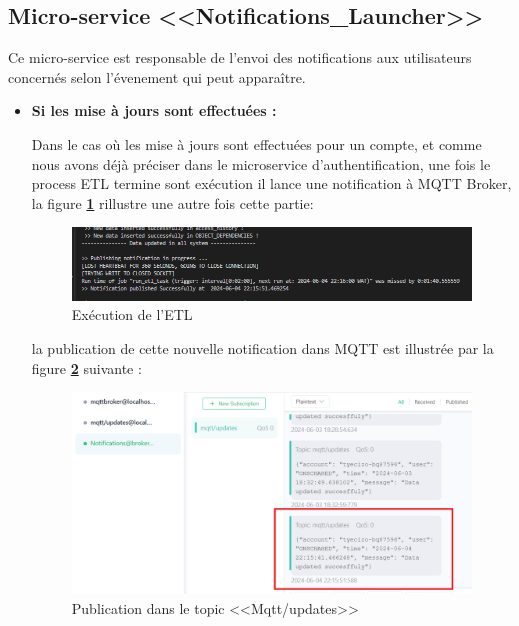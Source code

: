\subsection{Micro-service <<Notifications\_Launcher>>}
\par Ce micro-service est responsable de l'envoi des notifications aux utilisateurs concernés selon l'évenement qui peut apparaître.
\begin{itemize}
    \item \textbf{Si les mise à jours sont effectuées :}
        \par Dans le cas où les mise à jours sont effectuées pour un compte, et comme nous avons déjà préciser dans le  microservice d'authentification, une fois le process ETL termine sont exécution il lance une notification à MQTT Broker, la figure \textbf{\ref{fig:step1}} rillustre une autre fois cette partie: 
        \begin{figure}[H]
            \centering
            \includegraphics[width =1\linewidth]{img/captures/notifications/updatelaunch.png}
            \caption{Exécution de l'ETL}
            \label{fig:step1}
        \end{figure}
        \par la publication de cette nouvelle notification dans MQTT est illustrée par la figure \textbf{\ref{fig:step2}} suivante :
        \begin{figure}[H]
            \centering
            \includegraphics[width =1\linewidth]{img/captures/notifications/mqtt.png}
            \caption{Publication dans le topic <<Mqtt/updates>>}
            \label{fig:step2}
        \end{figure}

\end{itemize}
